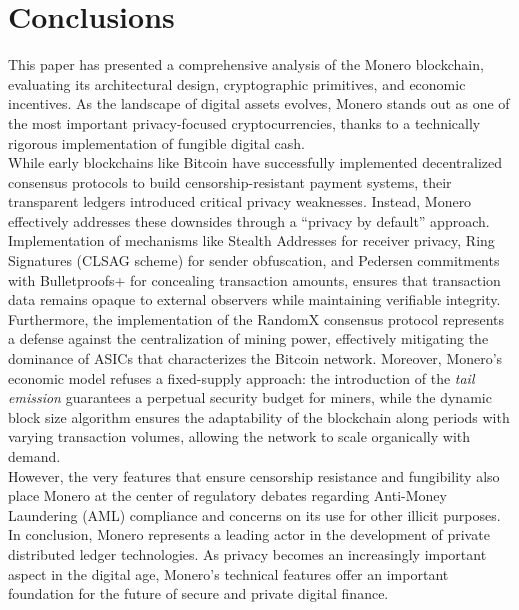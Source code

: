 \documentclass[conference]{IEEEtran}
\begin{document}
\section{Conclusions}
This paper has presented a comprehensive analysis of the Monero blockchain, evaluating its architectural design, cryptographic primitives, and economic incentives. As the landscape of digital assets evolves, Monero stands out as one of the most important privacy-focused cryptocurrencies, thanks to a technically rigorous implementation of fungible digital cash.\\
While early blockchains like Bitcoin have successfully implemented decentralized consensus protocols to build censorship-resistant payment systems, their transparent ledgers introduced critical privacy weaknesses. Instead, Monero effectively addresses these downsides through a ``privacy by default'' approach. Implementation of mechanisms like Stealth Addresses for receiver privacy, Ring Signatures (CLSAG scheme) for sender obfuscation, and Pedersen commitments with Bulletproofs+ for concealing transaction amounts, ensures that transaction data remains opaque to external observers while maintaining verifiable integrity.\\
Furthermore, the implementation of the RandomX consensus protocol represents a defense against the centralization of mining power, effectively mitigating the dominance of ASICs that characterizes the Bitcoin network. Moreover, Monero's economic model refuses a fixed-supply approach: the introduction of the \textit{tail emission} guarantees a perpetual security budget for miners, while the dynamic block size algorithm ensures the adaptability of the blockchain along periods with varying transaction volumes, allowing the network to scale organically with demand.\\
However, the very features that ensure censorship resistance and fungibility also place Monero at the center of regulatory debates regarding Anti-Money Laundering (AML) compliance and concerns on its use for other illicit purposes.\\
In conclusion, Monero represents a leading actor in the development of private distributed ledger technologies. As privacy becomes an increasingly important aspect in the digital age, Monero's technical features offer an important foundation for the future of secure and private digital finance.



\appendices
\end{document}

